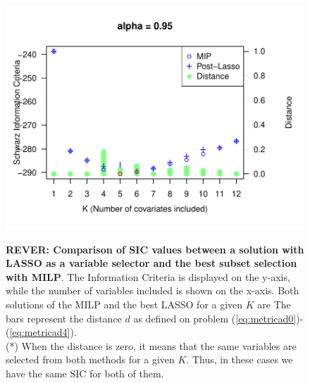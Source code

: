 \begin{figure}
\begin{minipage}[t]{0.4\linewidth}
\begin{minipage}[b]{\linewidth}
			\centering     \includegraphics[width=\textwidth]{Figuras/SIC095.pdf}
			\label{fig:npqar-cross}
		\end{minipage}
	\end{minipage}
	\caption{ \textbf{REVER: Comparison of SIC values between a solution with LASSO as a variable selector and the best subset selection with MILP}. The Information Criteria is displayed on the y-axis, while the number of variables included is shown on the x-axis. Both solutions of the MILP and the best LASSO for a given $K$ are  The bars represent the distance $d$ as defined on problem (\ref{eq:metricad0})-(\ref{eq:metricad4}). \\ (*) When the distance is zero, it means that the same variables are selected from both methods for a given $K$. Thus, in these cases we have the same SIC for both of them.}
	\label{fig:comparison-lm-results}
\end{figure}

